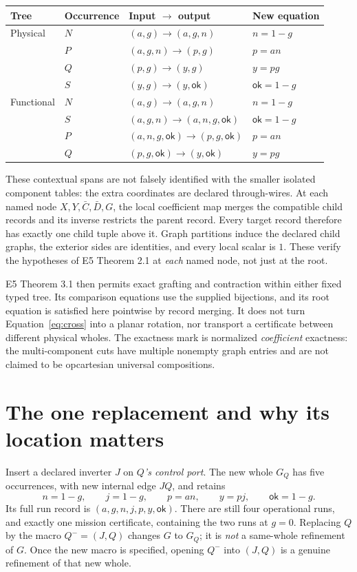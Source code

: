 \documentclass[11pt]{article}
\newcommand{\ok}{\mathsf{ok}}
\begin{document}
\begin{center}
\small
\begin{tabular}{llll}
\toprule
Tree&Occurrence&Input $\longrightarrow$ output&New equation\\
\midrule
Physical&$N$&$(a,g)\longrightarrow(a,g,n)$&$n=1-g$\\
&$P$&$(a,g,n)\longrightarrow(p,g)$&$p=an$\\
&$Q$&$(p,g)\longrightarrow(y,g)$&$y=pg$\\
&$S$&$(y,g)\longrightarrow(y,\ok)$&$\ok=1-g$\\
\midrule
Functional&$N$&$(a,g)\longrightarrow(a,g,n)$&$n=1-g$\\
&$S$&$(a,g,n)\longrightarrow(a,n,g,\ok)$&$\ok=1-g$\\
&$P$&$(a,n,g,\ok)\longrightarrow(p,g,\ok)$&$p=an$\\
&$Q$&$(p,g,\ok)\longrightarrow(y,\ok)$&$y=pg$\\
\bottomrule
\end{tabular}
\end{center}

These contextual spans are not falsely identified with the smaller isolated
component tables: the extra coordinates are declared through-wires. At each
named node $X,Y,\bar C,\bar D,G$, the local coefficient map merges the compatible
child records and its inverse restricts the parent record. Every target record
therefore has exactly one child tuple above it. Graph partitions induce the
declared child graphs, the exterior sides are identities, and every local
scalar is $1$. These verify the hypotheses of E5 Theorem 2.1 at \emph{each}
named node, not just at the root.

E5 Theorem 3.1 then permits exact grafting and contraction within either fixed
typed tree. Its comparison equations use the supplied bijections, and its root
equation is satisfied here pointwise by record merging. It does not turn
Equation~\eqref{eq:cross} into a planar rotation, nor transport a certificate
between different physical wholes. The exactness mark is normalized
\emph{coefficient} exactness: the multi-component cuts have multiple nonempty
graph entries and are not claimed to be opcartesian universal compositions.

\section{The one replacement and why its location matters}

Insert a declared inverter $J$ on \emph{$Q$'s control port}. The new whole $G_Q$
has five occurrences, with new internal edge $JQ$, and retains
\begin{equation}\label{eq:repaired}
 n=1-g,\qquad j=1-g,\qquad p=an,\qquad y=pj,
 \qquad\ok=1-g.
\end{equation}
Its full run record is $(a,g,n,j,p,y,\ok)$. There are still four operational
runs, and exactly one mission certificate, containing the two runs at $g=0$.
Replacing $Q$ by the macro $Q^-=(J,Q)$ changes $G$ to $G_Q$; it is \emph{not}
a same-whole refinement of $G$. Once the new macro is specified, opening $Q^-$
into $(J,Q)$ is a genuine refinement of that new whole.
\end{document}
